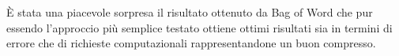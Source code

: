 
È stata una piacevole sorpresa il risultato ottenuto da Bag of Word che pur
essendo l'approccio più semplice testato ottiene ottimi risultati sia in termini
di errore che di richieste computazionali rappresentandone un buon compresso.
